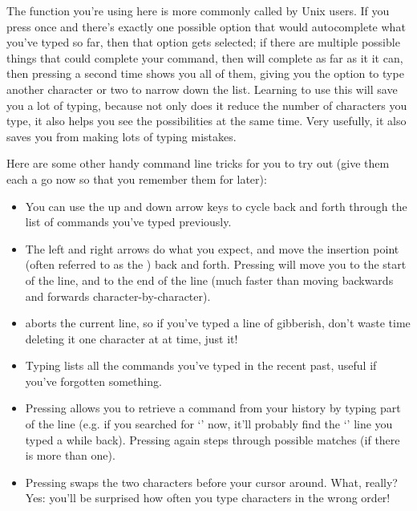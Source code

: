 The  function you're using here is more commonly called  by Unix users. If you press  once and there's exactly one possible option that would autocomplete what you've typed so far, then that option gets selected; if there are multiple possible things that could complete your command, then  will complete as far as it it can, then pressing  a second time shows you all of them, giving you the option to type another character or two to narrow down the list. Learning to use this will save you a lot of typing, because not only does it reduce the number of characters you type, it also helps you see the possibilities at the same time. Very usefully, it also saves you from making lots of typing mistakes.



Here are some other handy command line tricks for you to try out (give them each a go now so that you remember them for later):


\begin{itemize}
\item You can use the up and down arrow keys to cycle back and forth through the list of commands you've typed previously.
\item The left and right arrows do what you expect, and move the insertion point (often referred to as the ) back and forth. Pressing  will move you to the start of the line, and  to the end of the line (much faster than moving backwards and forwards character-by-character). 
\item {} aborts the current line, so if you've typed a line of gibberish, don't waste time deleting it one character at at time, just  it!
\item Typing  lists all the commands you've typed in the recent past, useful if you've forgotten something.
\item Pressing  allows you to retrieve a command from your history by typing part of the line (e.g. if you searched for `' now, it'll probably find the `' line you typed a while back). Pressing  again steps through possible matches (if there is more than one).
\item Pressing  swaps the two characters before your cursor around. What, really? Yes: you'll be surprised how often you type characters in the wrong order! 
\end{itemize}

